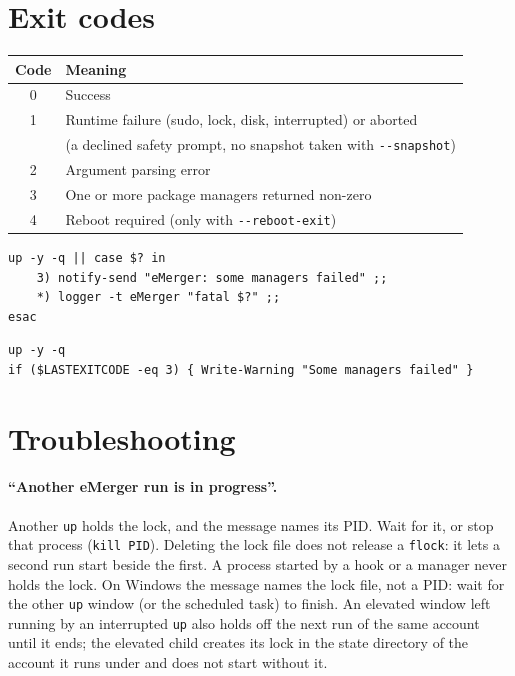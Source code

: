 \documentclass[11pt,a4paper]{article}
\begin{document}
\section{Exit codes}\label{sec:exit}
\begin{center}
\begin{tabular}{@{}cl@{}}
\toprule
\textbf{Code} & \textbf{Meaning} \\
\midrule
0 & Success \\
1 & Runtime failure (sudo, lock, disk, interrupted) or aborted \\
  & (a declined safety prompt, no snapshot taken with \texttt{-{}-snapshot}) \\
2 & Argument parsing error \\
3 & One or more package managers returned non-zero \\
4 & Reboot required (only with \texttt{-{}-reboot-exit}) \\
\bottomrule
\end{tabular}
\end{center}

\begin{lstlisting}[language=bashplus]
up -y -q || case $? in
    3) notify-send "eMerger: some managers failed" ;;
    *) logger -t eMerger "fatal $?" ;;
esac
\end{lstlisting}

\begin{lstlisting}[language=psplus]
up -y -q
if ($LASTEXITCODE -eq 3) { Write-Warning "Some managers failed" }
\end{lstlisting}

\section{Troubleshooting}\label{sec:trouble}

\paragraph{``Another eMerger run is in progress''.}
Another \texttt{up} holds the lock, and the message names its PID. Wait
for it, or stop that process (\texttt{kill PID}). Deleting the lock file
does not release a \texttt{flock}: it lets a second run start beside the
first. A process started by a hook or a manager never holds the lock.
On Windows the message names the lock file, not a PID: wait for the
other \texttt{up} window (or the scheduled task) to finish. An elevated
window left running by an interrupted \texttt{up} also holds off the next
run of the same account until it ends; the elevated child creates its lock
in the state directory of the account it runs under and does not start
without it.
\end{document}

